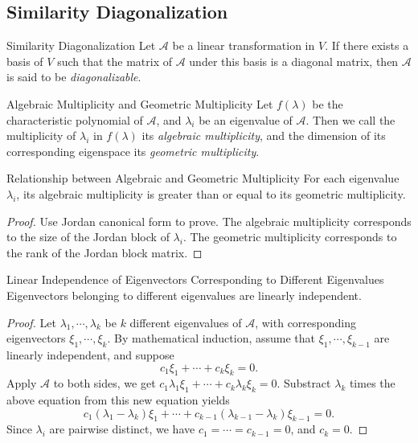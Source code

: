 \subsection{Similarity Diagonalization}

\begin{definition}{Similarity Diagonalization}{}
  Let $\mathcal{A}$ be a linear transformation in $V$.
  If there exists a basis of $V$ such that the matrix of $\mathcal{A}$
  under this basis is a diagonal matrix,
  then $\mathcal{A}$ is said to be \emph{diagonalizable}.
\end{definition}

\begin{definition}{Algebraic Multiplicity and Geometric Multiplicity}{}
  Let $f(\lambda)$ be the characteristic polynomial of $\mathcal{A}$,
  and $\lambda_i$ be an eigenvalue of $\mathcal{A}$.
  Then we call the multiplicity of $\lambda_i$ in $f(\lambda)$ its
  \emph{algebraic multiplicity},
  and the dimension of its corresponding eigenspace its \emph{geometric multiplicity}.
\end{definition}

\begin{lemma}{Relationship between Algebraic and Geometric Multiplicity}{}
  For each eigenvalue $\lambda_i$,
  its algebraic multiplicity is greater than or equal to its geometric multiplicity.
\end{lemma}

\begin{proof}
  Use Jordan canonical form to prove.
  The algebraic multiplicity corresponds to the size of the Jordan block of
  $\lambda_i$.
  The geometric multiplicity corresponds to the rank of the Jordan block matrix.
\end{proof}

\begin{proposition}{Linear Independence of Eigenvectors Corresponding to
    Different Eigenvalues}{}
  Eigenvectors belonging to different eigenvalues are linearly independent.
\end{proposition}

\begin{proof}
  Let $\lambda_1,\cdots,\lambda_k$ be $k$ different eigenvalues of
  $\mathcal{A}$,
  with corresponding eigenvectors $\xi_1,\cdots,\xi_k$.
  By mathematical induction, assume that $\xi_1,\cdots,\xi_{k-1}$ are linearly
  independent,
  and suppose
  \begin{equation}
    c_1\xi_1 + \cdots + c_k\xi_k = 0.
  \end{equation}
  Apply $\mathcal{A}$ to both sides, we get $c_1\lambda_1\xi_1 + \cdots +
  c_k\lambda_k\xi_k = 0$.
  Substract $\lambda_k$ times the above equation from this new equation yields
  \begin{equation}
    c_1(\lambda_1 - \lambda_k)\xi_1 + \cdots + c_{k-1}(\lambda_{k-1} - \lambda_k)\xi_{k-1} = 0.
  \end{equation}
  Since $\lambda_i$ are pairwise distinct,
  we have $c_1 = \cdots = c_{k-1} = 0$,
  and $c_k = 0$.
\end{proof}

